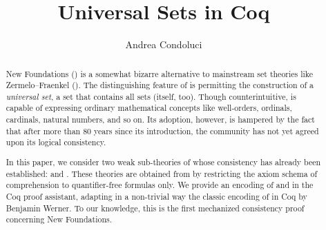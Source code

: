 \documentclass[sigplan,10pt,anonymous,review]{acmart}%
\begin{document}
\title{Universal Sets in Coq}

\author{Andrea Condoluci}


\begin{abstract}
New Foundations (\NF) is a somewhat bizarre alternative to mainstream set theories like Zermelo–Fraenkel (\ZF). The distinguishing feature of \NF{} is permitting the construction of a \emph{universal set}, \ie{} a set that contains all sets (itself, too). Though counterintuitive, \NF{} is capable of expressing ordinary mathematical concepts like well-orders, ordinals, cardinals, natural numbers, and so on. Its adoption, however, is hampered by the fact that after more than 80 years since its introduction, the community has not yet agreed upon its logical consistency.
  
In this paper, we consider two weak sub-theories of \NF{} whose consistency has already been established: \NFTWO{} and \NFO. These theories are obtained from \NF{} by restricting the axiom schema of comprehension to quantifier-free formulas only. We provide an encoding of \NFTWO{} and \NFO{} in the Coq proof assistant, adapting in a non-trivial way the classic encoding of \ZF{} in Coq by Benjamin Werner. To our knowledge, this is the first mechanized consistency proof concerning New Foundations.
\end{abstract}
\end{document}
